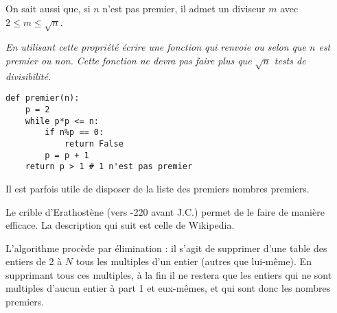On sait aussi que, si $n$ n'est pas premier, il admet un diviseur $m$ avec $2 \le m\le \sqrt n$.
\begin{Exercise}[title = Test de primalité 2]
\it En utilisant cette propriété écrire une fonction  qui renvoie  ou  selon que $n$ est premier ou non. Cette fonction ne devra pas faire plus que $\sqrt n$ tests de divisibilité.
\end{Exercise}
\begin{Answer}
\begin{lstlisting}
def premier(n):
    p = 2
    while p*p <= n:
        if n%p == 0:
            return False
        p = p + 1
    return p > 1 # 1 n'est pas premier
\end{lstlisting}
\end{Answer}
Il est parfois utile de disposer de la liste des premiers nombres premiers.

Le crible d'Erathostène (vers -220 avant J.C.) permet de le faire de manière efficace. La description qui suit est celle de Wikipedia.

L'algorithme procède par élimination : il s'agit de supprimer d'une table des entiers de 2 à $N$ tous les multiples d'un entier (autres que lui-même). En supprimant tous ces multiples, à la fin il ne restera que les entiers qui ne sont multiples d'aucun entier à part 1 et eux-mêmes, et qui sont donc les nombres premiers.

